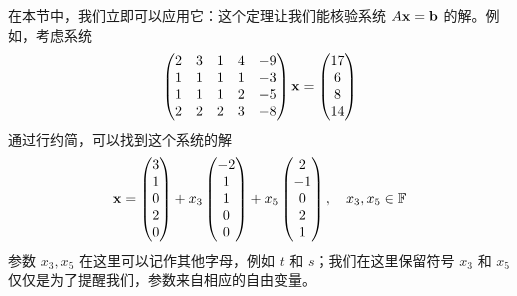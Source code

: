 在本节中，我们立即可以应用它：这个定理让我们能核验系统 $A \mathbf{x} = \mathbf{b}$ 的解。例如，考虑系统
$$
\begin{pmatrix} 2 & 3 & 1 & 4 & -9 \\ 1 & 1 & 1 & 1 & -3 \\ 1 & 1 & 1 & 2 & -5 \\ 2 & 2 & 2 & 3 & -8 \end{pmatrix} \mathbf{x} = \begin{pmatrix} 17 \\ 6 \\ 8 \\ 14 \end{pmatrix}
$$
通过行约简，可以找到这个系统的解
\begin{equation}\label{eq:02-06-01}
\mathbf{x} = \begin{pmatrix} 3 \\ 1 \\ 0 \\ 2 \\ 0 \end{pmatrix} + x_3 \begin{pmatrix} -2 \\ 1 \\ 1 \\ 0 \\ 0 \end{pmatrix} + x_5 \begin{pmatrix} 2 \\ -1 \\ 0 \\ 2 \\ 1 \end{pmatrix}, \quad x_3, x_5 \in \mathbb{F}
\end{equation}
参数 $x_3, x_5$ 在这里可以记作其他字母，例如 $t$ 和 $s$；我们在这里保留符号 $x_3$ 和 $x_5$ 仅仅是为了提醒我们，参数来自相应的自由变量。

